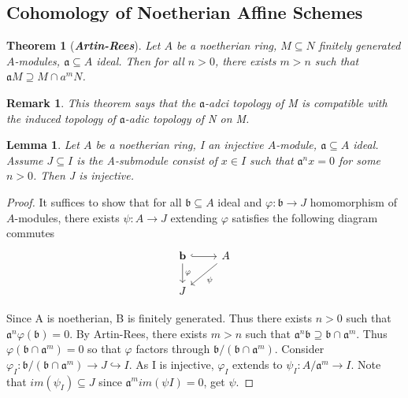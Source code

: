 \documentclass{ctexart}
\newtheorem{remark}{Remark}[section]
\newtheorem{theorem}{Theorem}[section]
\newtheorem{lemma}{Lemma}[section]
\begin{document}
\subsection{Cohomology of Noetherian Affine Schemes}
\begin{theorem}[\textbf{\emph{Artin-Rees}}]
    Let $A$ be a noetherian ring, $M \subseteq N$ finitely generated $A$-modules, $\mathfrak{a} \subseteq A$ ideal.
    Then for all $n > 0$, there exists $m > n$ such that $\mathfrak{a}M \supseteq M \cap a^{m}N$.
    \label{Theorem 7.2}
\end{theorem}
\begin{remark}
    This theorem says that the $\mathfrak{a}$-adci topology of M is compatible with the induced topology of $\mathfrak{a}$-adic topology of N on M. 
\end{remark}
\begin{lemma}
    Let $A$ be a noetherian ring, I an injective $A$-module, $\mathfrak{a} \subseteq A$ ideal.
    Assume $J \subseteq I$ is the A-submodule consist of $x\in I$ such that $\mathfrak{a}^{n}x= 0$ for some $n > 0$.
    Then J is injective.
    \label{Lemma 7.1}
\end{lemma}
\begin{proof}
    It suffices to show that for all $\mathfrak{b} \subseteq A$ ideal and $\varphi: \mathfrak{b} \longrightarrow J$ homomorphism of $A$-modules,
    there exists $\psi: A \longrightarrow J$ extending $\varphi$ satisfies the following diagram commutes
    \begin{equation*}
        \begin{tikzcd}
            \mathbf{b} \arrow[r, hookrightarrow] \arrow[d, "\varphi"] &
            A \arrow[dl, "\psi"] \\
            J &
        \end{tikzcd}
    \end{equation*}
    \par
    Since A is noetherian, B is finitely generated.
    Thus there exists $n > 0$ such that $\mathfrak{a}^{n}\varphi(\mathfrak{b}) = 0$.
    By Artin-Rees, there exists $m > n$ such that $\mathfrak{a}^{n}\mathfrak{b} \supseteq \mathfrak{b} \cap \mathfrak{a}^{m}$.
    Thus $\varphi(\mathfrak{b} \cap \mathfrak{a}^{m}) = 0$ so that $\varphi$ factors through $\mathfrak{b}/(\mathfrak{b} \cap \mathfrak{a}^{m})$.
    Consider $\varphi_{I}: \mathfrak{b}/(\mathfrak{b} \cap \mathfrak{a}^{m}) \longrightarrow J \hookrightarrow I$.
    As I is injective, $\varphi_{I}$ extends to $\psi_{I}: A/\mathfrak{a}^{m} \longrightarrow I$.
    Note that $im(\psi_{I}) \subseteq J$ since $\mathfrak{a}^{m}im(\psi{I}) = 0$, get $\psi$. 
\end{proof}
\end{document}
